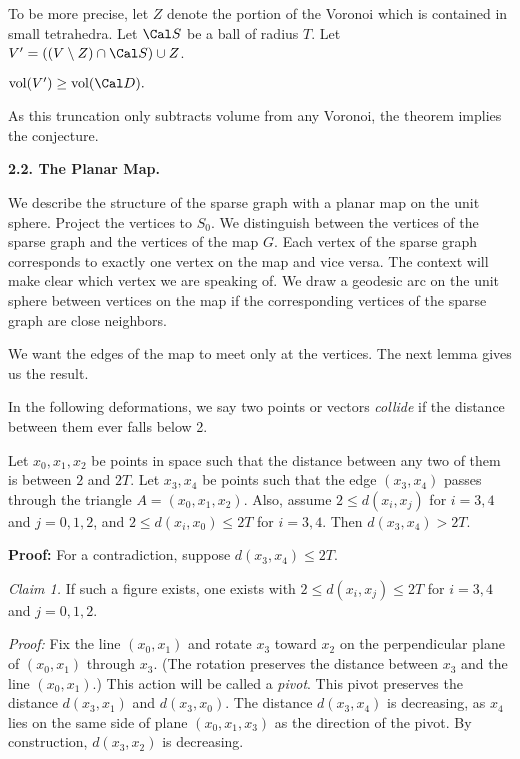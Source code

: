 To be more precise,
let $Z$ denote the portion of the Voronoi which is contained in small tetrahedra.
 Let $\Cal S$ be a ball of radius $T$.
Let $V'=((V\setminus Z)\cap \Cal S)\cup Z$.  

 $\vol(V') \ge \vol(\Cal D).$ \endproclaim

As this truncation only subtracts volume from any Voronoi, the theorem implies the conjecture.

\bigskip

{\bf 2.2. The Planar Map.}

We describe the structure of the sparse graph with a planar map on the unit
sphere. 
Project the vertices to $S_0$.  We distinguish between the vertices of the sparse graph and 
the vertices of the map $G$.  Each vertex of the sparse graph corresponds to 
exactly one vertex on the map and vice versa.  The context will make clear 
which  vertex we are speaking of.  We draw a geodesic arc on the
unit sphere between 
vertices on the map if the corresponding vertices of the sparse graph 
are close neighbors.  

We want the edges of the map to meet only at the vertices.  The next lemma 
gives us the result.

In the following deformations, we say two points or vectors {\it collide} if the distance between them
 ever falls below 2.

  Let $x_0,x_1,x_2$ be points in space such that 
the distance between any two of them is between $2$ and $2T$.
Let $x_3,x_4$ be points such that the edge 
$(x_3,x_4)$ passes through the triangle $A=(x_0,x_1,x_2)$.  
Also, assume $2\le d(x_i,x_j)$ for $i=3,4$ and $j=0,1,2$, and  
$2\le d(x_i,x_0)\le 2T$ for $i=3,4$.
Then $d(x_3,x_4)>2T$.
\endproclaim

{\bf Proof:} For a contradiction, suppose $d(x_3,x_4)\le 2T$.  

\smallskip

{\it Claim 1.} If such a figure exists, one exists with 
$2\le d(x_i,x_j)\le 2T$ for $i=3,4$ and $j=0,1,2$.

\smallskip

{\it Proof:} Fix the line $(x_0,x_1)$ and rotate $x_3$ toward $x_2$ on the perpendicular
 plane of $(x_0,x_1)$ through $x_3$.  (The rotation preserves the distance between $x_3$ and the line $(x_0,x_1)$.)  This action will be called a {\it pivot}. 
 This pivot preserves the distance $d(x_3,x_1)$ and $d(x_3,x_0)$.  
The distance $d(x_3,x_4)$ is decreasing, as $x_4$ lies on the same side
of plane $(x_0,x_1,x_3)$ as the direction of the pivot.  By construction, $d(x_3,x_2)$ is decreasing.  

